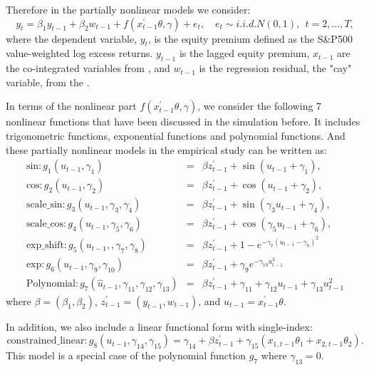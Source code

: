 \documentclass[a4paper,12pt,times,numbered,print,index]{report}
\numberwithin{equation}{section}
\begin{document}
Therefore in the partially nonlinear models we consider: 
$$
y_{t} = \beta_{1} y_{t-1} + \beta_{2} w_{t-1} + f\left( x_{t-1}^{\prime }\theta,\gamma\right) +e_{t}, \quad
e_{t}\sim i.i.d.N\left( 0,1\right) ,\ \ t=2,...,T,
$$
where the dependent variable, $y_t$, is the equity premium defined as the S\&P500 value-weighted log excess returns. $y_{t-1}$ is the lagged equity premium, $x_{t-1}$ are the co-integrated variables from \cite{zhou2018semiparametric}, and $w_{t-1}$ is the regression residual, the "cay" variable, from the \cite{lettau2001consumption}. 

In terms of the nonlinear part $f\left( x_{t-1}^{\prime }\theta,\gamma\right)$, we consider the following 7 nonlinear functions that have been discussed in the simulation before. It includes trigonometric functions, exponential functions and polynomial functions. And these partially nonlinear models in the empirical study can be written as:
\begin{eqnarray*}
	\text{sin}: g_{1}\left( {u}_{t-1},\gamma _{1}\right) &=& \beta z_{t-1}^{\prime} + \sin \left( {u}_{t-1}+\gamma_{1}\right),  \\
	\text{cos}: g_{2}\left( {u}_{t-1},\gamma _{2}\right) &=& \beta z_{t-1}^{\prime} + \cos \left( {u}_{t-1}+\gamma_{2}\right), \\
	\text{scale\_sin}: g_{3}\left( {u}_{t-1},\gamma_{3}, \gamma_{4}\right) &=& \beta z_{t-1}^{\prime} + \sin \left( \gamma_{3}{u}_{t-1}+\gamma_{4}\right),  \\
	\text{scale\_cos}: g_{4}\left( {u}_{t-1},\gamma_{5}, \gamma_{6}\right) &=& \beta z_{t-1}^{\prime} + \cos \left( \gamma_{5}{u}_{t-1}+\gamma_{6}\right), \\
	\text{exp\_shift}: g_{5}\left( {u}_{t-1},,\gamma_{7}, \gamma_{8}\right) &=&  \beta z_{t-1}^{\prime} + 1-e^{-\gamma_{7}\left({u}_{t-1}-\gamma_{8}\right)^{2}} \\
	\text{exp}: g_{6}\left( {u}_{t-1},\gamma_{9}, \gamma_{10}\right) &=&  \beta z_{t-1}^{\prime} + \gamma_{9} e^{-\gamma_{10}{u}_{t-1}^2}  \\
	\text{Polynomial}: g_{7}\left( \hat{u}_{t-1},\gamma_{11}, \gamma_{12}, \gamma_{13}\right) &=& \beta z_{t-1}^{\prime} + \gamma_{11}+ \gamma_{12}{u}_{t-1}+\gamma_{13}{u}_{t-1}^{2}
\end{eqnarray*}%
where $\beta = (\beta_{1}, \beta_{2})$, $ z_{t-1}^{\prime } = (y_{t-1}, w_{t-1})$, and $u_{t-1} =  x_{t-1}^{\prime }\theta$.


In addition, we also include a linear functional form with single-index:
$$
\text{constrained\_linear}: g_8\left( u_{t-1},\gamma_{14}, \gamma_{15}\right) = \gamma_{14} +\beta z_{t-1}^{\prime} + \gamma_{15}(x_{1,t-1}\theta _{1} + x_{2,t-1}\theta _{2}).
$$
This model is a special case of the polynomial function $g_7$ where $\gamma_{13} = 0$.
\end{document}
